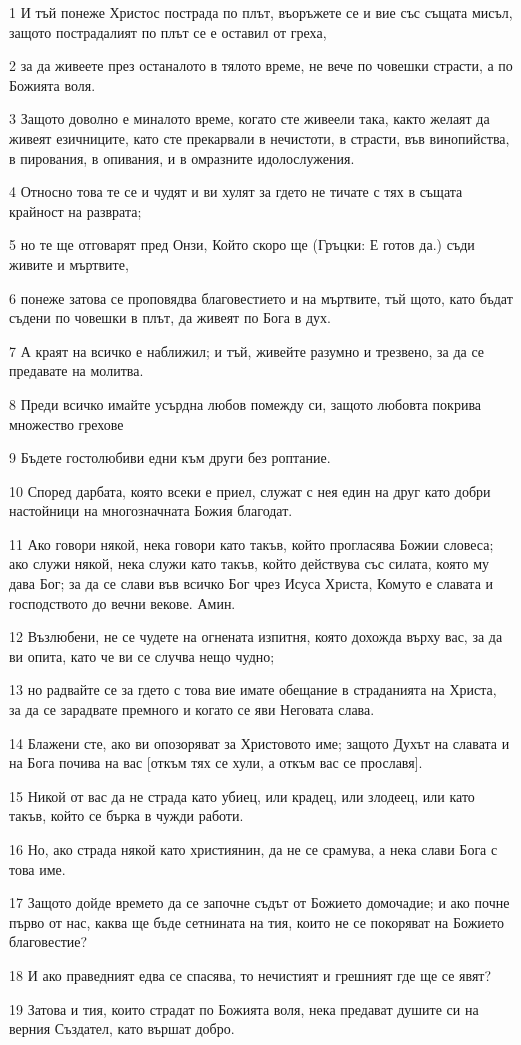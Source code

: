 \par 1 И тъй понеже Христос пострада по плът, въоръжете се и вие със същата мисъл, защото пострадалият по плът се е оставил от греха,
\par 2 за да живеете през останалото в тялото време, не вече по човешки страсти, а по Божията воля.
\par 3 Защото доволно е миналото време, когато сте живеели така, както желаят да живеят езичниците, като сте прекарвали в нечистоти, в страсти, във винопийства, в пирования, в опивания, и в омразните идолослужения.
\par 4 Относно това те се и чудят и ви хулят за гдето не тичате с тях в същата крайност на разврата;
\par 5 но те ще отговарят пред Онзи, Който скоро ще (Гръцки: Е готов да.) съди живите и мъртвите,
\par 6 понеже затова се проповядва благовестието и на мъртвите, тъй щото, като бъдат съдени по човешки в плът, да живеят по Бога в дух.
\par 7 А краят на всичко е наближил; и тъй, живейте разумно и трезвено, за да се предавате на молитва.
\par 8 Преди всичко имайте усърдна любов помежду си, защото любовта покрива множество грехове
\par 9 Бъдете гостолюбиви едни към други без роптание.
\par 10 Според дарбата, която всеки е приел, служат с нея един на друг като добри настойници на многозначната Божия благодат.
\par 11 Ако говори някой, нека говори като такъв, който прогласява Божии словеса; ако служи някой, нека служи като такъв, който действува със силата, която му дава Бог; за да се слави във всичко Бог чрез Исуса Христа, Комуто е славата и господството до вечни векове. Амин.
\par 12 Възлюбени, не се чудете на огнената изпитня, която дохожда върху вас, за да ви опита, като че ви се случва нещо чудно;
\par 13 но радвайте се за гдето с това вие имате обещание в страданията на Христа, за да се зарадвате премного и когато се яви Неговата слава.
\par 14 Блажени сте, ако ви опозоряват за Христовото име; защото Духът на славата и на Бога почива на вас [откъм тях се хули, а откъм вас се прославя].
\par 15 Никой от вас да не страда като убиец, или крадец, или злодеец, или като такъв, който се бърка в чужди работи.
\par 16 Но, ако страда някой като християнин, да не се срамува, а нека слави Бога с това име.
\par 17 Защото дойде времето да се започне съдът от Божието домочадие; и ако почне първо от нас, каква ще бъде сетнината на тия, които не се покоряват на Божието благовестие?
\par 18 И ако праведният едва се спасява, то нечистият и грешният где ще се явят?
\par 19 Затова и тия, които страдат по Божията воля, нека предават душите си на верния Създател, като вършат добро.

